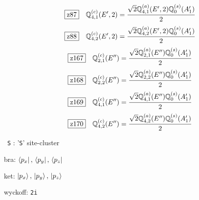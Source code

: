 \documentclass[fleqn,10pt,landscape]{jsarticle}
\begin{document}
\begin{dmath*}
\hspace*{3mm}\fbox{z87}\quad \mathbb{Q}_{4,1}^{(c)}(E^{\prime},2)=\frac{\sqrt{2} \mathbb{Q}_{4,1}^{(a)}(E^{\prime},2) \mathbb{Q}_{0}^{(s)}(A_{1}^{\prime})}{2}
\end{dmath*}
\begin{dmath*}
\hspace*{3mm}\fbox{z88}\quad \mathbb{Q}_{4,2}^{(c)}(E^{\prime},2)=\frac{\sqrt{2} \mathbb{Q}_{4,2}^{(a)}(E^{\prime},2) \mathbb{Q}_{0}^{(s)}(A_{1}^{\prime})}{2}
\end{dmath*}
\begin{dmath*}
\hspace*{3mm}\fbox{z167}\quad \mathbb{Q}_{2,1}^{(c)}(E^{\prime\prime})=\frac{\sqrt{2} \mathbb{Q}_{2,1}^{(a)}(E^{\prime\prime}) \mathbb{Q}_{0}^{(s)}(A_{1}^{\prime})}{2}
\end{dmath*}
\begin{dmath*}
\hspace*{3mm}\fbox{z168}\quad \mathbb{Q}_{2,2}^{(c)}(E^{\prime\prime})=\frac{\sqrt{2} \mathbb{Q}_{2,2}^{(a)}(E^{\prime\prime}) \mathbb{Q}_{0}^{(s)}(A_{1}^{\prime})}{2}
\end{dmath*}
\begin{dmath*}
\hspace*{3mm}\fbox{z169}\quad \mathbb{Q}_{4,1}^{(c)}(E^{\prime\prime})=\frac{\sqrt{2} \mathbb{Q}_{4,1}^{(a)}(E^{\prime\prime}) \mathbb{Q}_{0}^{(s)}(A_{1}^{\prime})}{2}
\end{dmath*}
\begin{dmath*}
\hspace*{3mm}\fbox{z170}\quad \mathbb{Q}_{4,2}^{(c)}(E^{\prime\prime})=\frac{\sqrt{2} \mathbb{Q}_{4,2}^{(a)}(E^{\prime\prime}) \mathbb{Q}_{0}^{(s)}(A_{1}^{\prime})}{2}
\end{dmath*}
\vspace{5mm}

\noindent\textbullet\, \texttt{S} : '\texttt{S}' site-cluster

\noindent\quad * bra: $\bra{p_{x}},\, \bra{p_{y}},\, \bra{p_{z}}$

\noindent\quad * ket: $\ket{p_{x}},\, \ket{p_{y}},\, \ket{p_{z}}$

\noindent\quad * wyckoff: \texttt{2i}
\end{document}
